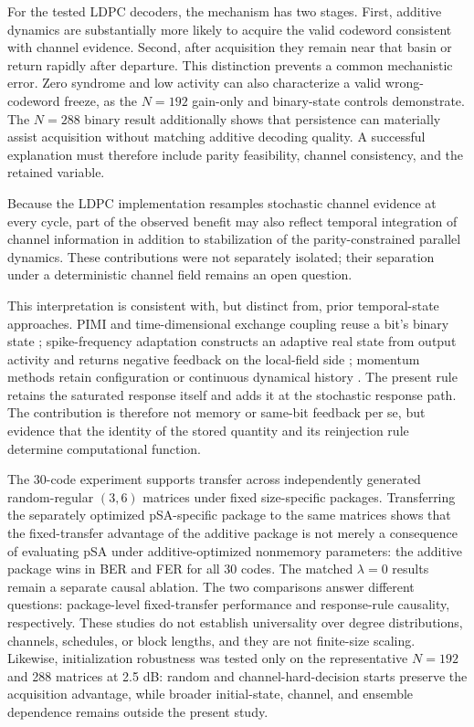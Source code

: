 \documentclass[aps,prapplied,reprint,superscriptaddress,longbibliography,floatfix]{revtex4-2}
\newcommand{\psa}{pSA}
\begin{document}
For the tested LDPC decoders, the mechanism has two stages.  First, additive dynamics are substantially more likely to acquire the valid codeword consistent with channel evidence.  Second, after acquisition they remain near that basin or return rapidly after departure.  This distinction prevents a common mechanistic error.  Zero syndrome and low activity can also characterize a valid wrong-codeword freeze, as the $N=192$ gain-only and binary-state controls demonstrate.  The $N=288$ binary result additionally shows that persistence can materially assist acquisition without matching additive decoding quality.  A successful explanation must therefore include parity feasibility, channel consistency, and the retained variable.

Because the LDPC implementation resamples stochastic channel evidence at every cycle, part of the observed benefit may also reflect temporal integration of channel information in addition to stabilization of the parity-constrained parallel dynamics.  These contributions were not separately isolated; their separation under a deterministic channel field remains an open question.

This interpretation is consistent with, but distinct from, prior temporal-state approaches.  PIMI and time-dimensional exchange coupling reuse a bit's binary state \cite{zhu2026pimi,du2026tec}; spike-frequency adaptation constructs an adaptive real state from output activity and returns negative feedback on the local-field side \cite{xu2025sfa}; momentum methods retain configuration or continuous dynamical history \cite{okuyama2019momentum,brown2024momentumcim}.  The present rule retains the saturated response itself and adds it at the stochastic response path.  The contribution is therefore not memory or same-bit feedback per se, but evidence that the identity of the stored quantity and its reinjection rule determine computational function.

The 30-code experiment supports transfer across independently generated random-regular $(3,6)$ matrices under fixed size-specific packages.  Transferring the separately optimized pSA-specific package to the same matrices shows that the fixed-transfer advantage of the additive package is not merely a consequence of evaluating \psa{} under additive-optimized nonmemory parameters: the additive package wins in BER and FER for all 30 codes.  The matched $\lambda=0$ results remain a separate causal ablation.  The two comparisons answer different questions: package-level fixed-transfer performance and response-rule causality, respectively.  These studies do not establish universality over degree distributions, channels, schedules, or block lengths, and they are not finite-size scaling.  Likewise, initialization robustness was tested only on the representative $N=192$ and 288 matrices at 2.5 dB: random and channel-hard-decision starts preserve the acquisition advantage, while broader initial-state, channel, and ensemble dependence remains outside the present study.
\end{document}
